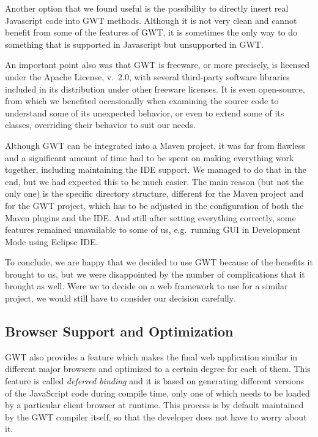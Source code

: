 Another option that we found useful is the possibility to directly insert real Javascript code into GWT methods. Although it is not very clean and cannot benefit from some of the features of GWT, it is sometimes the only way to do something that is supported in Javascript but unsupported in GWT.

An important point also was that GWT is freeware, or more precisely, is licensed under the Apache License, v.~2.0, with several third-party software libraries included in its distribution under other freeware licenses. It is even open-source, from which we benefited occasionally when examining the source code to understand some of its unexpected behavior, or even to extend some of its classes, overriding their behavior to suit our needs.

Although GWT can be integrated into a Maven project, it was far from flawless and a significant amount of time had to be spent on making everything work together, including maintaining the IDE support. We managed to do that in the end, but we had expected this to be much easier. 
The main reason (but not the only one) is the specific directory structure, different for the Maven project and for the GWT project, which has to be adjusted in the configuration of both the Maven plugins and the IDE.
And still after setting everything correctly, some features remained unavailable to some of us, e.g.\ running GUI in Development Mode using Eclipse IDE.

To conclude, we are happy that we decided to use GWT because of the benefits it brought to us, but we were disappointed by the number of complications that it brought as well. Were we to decide on a web framework to use for a similar project, we would still have to consider our decision carefully.


\subsection{Browser Support and Optimization}
GWT also provides a feature which makes the final web application similar in different major browsers and optimized to a certain degree for each of them. This feature is called {\em deferred binding} and it is based on generating different versions of the JavaScript code during compile time, only one of which needs to be loaded by a particular client browser at runtime. This process is by default maintained by the GWT compiler itself, so that the developer does not have to worry about it.

